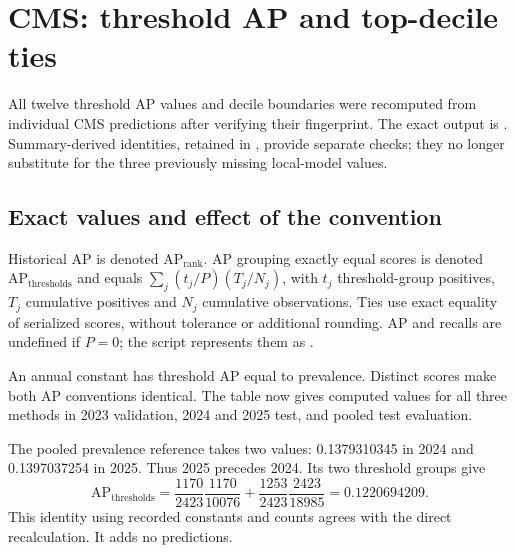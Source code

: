 \par{}
\section{CMS: threshold AP and top-decile ties}
\label{supp:ties}
All twelve threshold AP values and decile boundaries were recomputed from individual CMS predictions after verifying their fingerprint. The exact output is . Summary-derived identities, retained in , provide separate checks; they no longer substitute for the three previously missing local-model values.

\subsection{Exact values and effect of the convention}
Historical AP is denoted $\mathrm{AP}_{\mathrm{rank}}$. AP grouping exactly equal scores is denoted $\mathrm{AP}_{\mathrm{thresholds}}$ and equals $\sum_j(t_j/P)(T_j/N_j)$, with $t_j$ threshold-group positives, $T_j$ cumulative positives and $N_j$ cumulative observations\cite{sklearnap}. Ties use exact equality of serialized scores, without tolerance or additional rounding. AP and recalls are undefined if $P=0$; the script represents them as .

An annual constant has threshold AP equal to prevalence. Distinct scores make both AP conventions identical. The table now gives computed values for all three methods in 2023 validation, 2024 and 2025 test, and pooled test evaluation.

\begin{table}[!htbp]\centering\small
\caption{AP calculated from frozen individual predictions. Nine decimal places distinguish numerical precision from statistical uncertainty; no new interval is attached to threshold AP.}

\end{table}

The pooled prevalence reference takes two values: 0.1379310345 in 2024 and 0.1397037254 in 2025. Thus 2025 precedes 2024. Its two threshold groups give
\[
\mathrm{AP}_{\mathrm{thresholds}}=
\frac{1170}{2423}\frac{1170}{10076}
+\frac{1253}{2423}\frac{2423}{18985}=0.1220694209.
\]
This identity using recorded constants and counts agrees with the direct recalculation. It adds no predictions.


